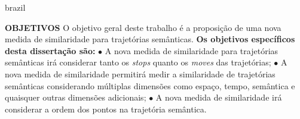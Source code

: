 {\begin{otherlanguage*}{brazil}
\begin{resumo}
        \newline
        \newline
        \textbf{OBJETIVOS}
        \newline
        \newline
        O objetivo geral deste trabalho é a proposição de uma nova medida de similaridade para trajetórias semânticas.
        \newline
        \textbf{Os objetivos específicos desta dissertação são:}
        \newline
        $\bullet$ A nova medida de similaridade para trajetórias semânticas irá considerar tanto os \emph{stops} quanto os \emph{moves} das trajetórias;
        \newline
        $\bullet$ A nova medida de similaridade permitirá medir a similaridade de trajetórias semânticas considerando múltiplas dimensões como espaço, tempo, semântica e quaisquer outras dimensões adicionais;
        \newline
        $\bullet$ A nova medida de similaridade irá considerar a ordem dos pontos na trajetória semântica.
        \newline
        \newline
        

\end{resumo}
\end{otherlanguage*}}
